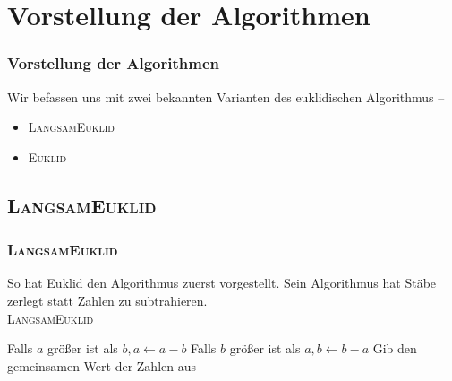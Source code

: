 \documentclass[•]{beamer}
\begin{document}
\section{Vorstellung der Algorithmen}
\begin{frame}
	\frametitle{Vorstellung der Algorithmen}
	Wir befassen uns mit zwei bekannten Varianten des euklidischen Algorithmus --
	
	\begin{itemize}
	\item \textsc{LangsamEuklid}
	\item \textsc{Euklid}
	\end{itemize}
\end{frame}


\subsection{\textsc{LangsamEuklid}}
\begin{frame}
	\frametitle{\textsc{LangsamEuklid}}
	So hat Euklid den Algorithmus zuerst vorgestellt. Sein Algorithmus hat St\"abe zerlegt statt Zahlen zu subtrahieren.\\
	\vspace{3pt}
	\underline{\textsc{LangsamEuklid}}
	\begin{algorithmic}[1]
	\State Falls $a$ gr\"o{\ss}er ist als $b, a\gets a-b$
	\State Falls $b$ gr\"o{\ss}er ist als $a, b\gets b-a$
\EndWhile
	\State Gib den gemeinsamen Wert der Zahlen aus
\end{algorithmic}
\end{frame}
\end{document}
